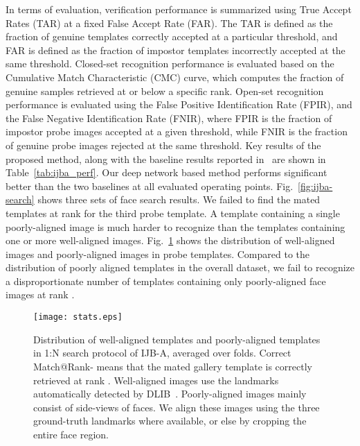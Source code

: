 \documentclass[10pt,journal,compsoc]{IEEEtran}
\begin{document}
In terms of evaluation, verification performance is summarized using True Accept Rates (TAR) at a fixed False Accept Rate (FAR). The TAR is defined as the fraction of genuine templates correctly accepted at a particular threshold, and FAR is defined as the fraction of impostor templates incorrectly accepted at the same threshold. Closed-set recognition performance is evaluated based on the Cumulative Match Characteristic (CMC) curve, which computes the fraction of genuine samples retrieved at or below a specific rank. Open-set recognition performance is evaluated using the False Positive Identification Rate (FPIR), and the False Negative Identification Rate (FNIR), where FPIR is the fraction of impostor probe images accepted at a given threshold, while FNIR is the fraction of genuine probe images rejected at the same threshold. Key results of the proposed method, along with the baseline results reported in~\cite{db:janus} are shown in Table~\ref{tab:ijba_perf}. Our deep network based method performs significant better than the two baselines at all evaluated operating points. Fig.~\ref{fig:ijba-search} shows three sets of face search results. We failed to find the mated templates at rank  for the third probe template. A template containing a single poorly-aligned image is much harder to recognize than the templates containing one or more well-aligned images. Fig.~\ref{fig:stats} shows the distribution of well-aligned images and poorly-aligned images in probe templates. Compared to the distribution of poorly aligned templates in the overall dataset, we fail to recognize a disproportionate number of templates containing only poorly-aligned face images at rank .

\begin{figure}
\centering
  \texttt{[image: stats.eps]}\\
  \caption{Distribution of well-aligned templates and poorly-aligned templates in 1:N search protocol of IJB-A, averaged over  folds. Correct Match@Rank- means that the mated gallery template is correctly retrieved at rank . Well-aligned images use the landmarks automatically detected by DLIB~\cite{kazemi2014one}. Poorly-aligned images mainly consist of side-views of faces. We align these images using the three ground-truth landmarks where available, or else by cropping the entire face region. }\label{fig:stats}
\end{figure}
\end{document}

